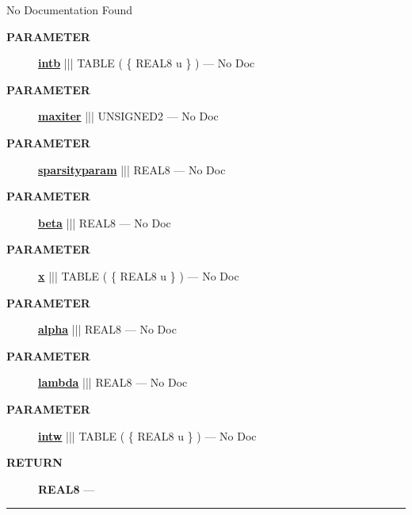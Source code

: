 \par





No Documentation Found






\par
\begin{description}
\item [\colorbox{tagtype}{\color{white} \textbf{\textsf{PARAMETER}}}] \textbf{\underline{intb}} ||| TABLE ( \{ REAL8 u \} ) --- No Doc
\item [\colorbox{tagtype}{\color{white} \textbf{\textsf{PARAMETER}}}] \textbf{\underline{maxiter}} ||| UNSIGNED2 --- No Doc
\item [\colorbox{tagtype}{\color{white} \textbf{\textsf{PARAMETER}}}] \textbf{\underline{sparsityparam}} ||| REAL8 --- No Doc
\item [\colorbox{tagtype}{\color{white} \textbf{\textsf{PARAMETER}}}] \textbf{\underline{beta}} ||| REAL8 --- No Doc
\item [\colorbox{tagtype}{\color{white} \textbf{\textsf{PARAMETER}}}] \textbf{\underline{x}} ||| TABLE ( \{ REAL8 u \} ) --- No Doc
\item [\colorbox{tagtype}{\color{white} \textbf{\textsf{PARAMETER}}}] \textbf{\underline{alpha}} ||| REAL8 --- No Doc
\item [\colorbox{tagtype}{\color{white} \textbf{\textsf{PARAMETER}}}] \textbf{\underline{lambda}} ||| REAL8 --- No Doc
\item [\colorbox{tagtype}{\color{white} \textbf{\textsf{PARAMETER}}}] \textbf{\underline{intw}} ||| TABLE ( \{ REAL8 u \} ) --- No Doc
\end{description}







\par
\begin{description}
\item [\colorbox{tagtype}{\color{white} \textbf{\textsf{RETURN}}}] \textbf{REAL8} --- 
\end{description}




\rule{\linewidth}{0.5pt}




